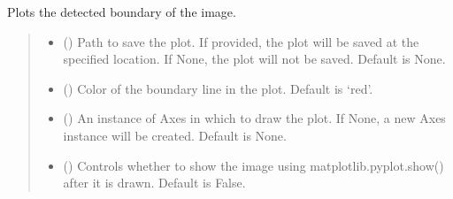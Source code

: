 \documentclass[letterpaper,10pt,english]{sphinxmanual}
\begin{document}
\begin{fulllineitems}
\begin{fulllineitems}
\label{\detokenize{forensicfit.core.analyzer:forensicfit.core.analyzer.Analyzer.plot_boundary}}
\pysigstartsignatures
{}
\pysigstopsignatures
\sphinxAtStartPar
Plots the detected boundary of the image.
\begin{quote}\begin{description}
\begin{itemize}
\item {} 
\sphinxAtStartPar
{} (\sphinxstyleliteralemphasis{\sphinxupquote{{[}}}\sphinxstyleliteralemphasis{\sphinxupquote{, }}\sphinxstyleliteralemphasis{\sphinxupquote{{]}}}\sphinxstyleliteralemphasis{\sphinxupquote{, }}) \textendash{} Path to save the plot. If provided, the plot will be saved at the
specified location. If None, the plot will not be saved.
Default is None.

\item {} 
\sphinxAtStartPar
{} (\sphinxstyleliteralemphasis{\sphinxupquote{, }}) \textendash{} Color of the boundary line in the plot. Default is ‘red’.

\item {} 
\sphinxAtStartPar
{} (\sphinxstyleliteralemphasis{\sphinxupquote{, }}) \textendash{} An instance of Axes in which to draw the plot. If None, a new
Axes instance will be created. Default is None.

\item {} 
\sphinxAtStartPar
{} (\sphinxstyleliteralemphasis{\sphinxupquote{, }}) \textendash{} Controls whether to show the image using matplotlib.pyplot.show()
after it is drawn. Default is False.


\end{itemize}
\end{description}
\end{quote}
\end{fulllineitems}
\end{fulllineitems}
\end{document}
